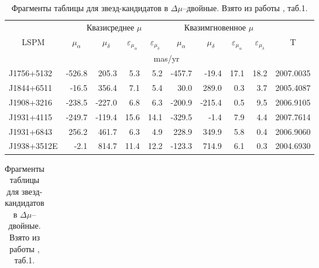 \begin{table}[htbp]
\centering
\caption{Фрагменты таблицы для звезд-кандидатов в $\Delta\mu$--двойные.  Взято из работы \cite{2015AstL...41..833K}, таб.1.}
\label{tab:candidates}
\vspace{5mm}
\begin{tabularx}{\textwidth}{l|r|r|r|r|r|r|r|r|l} \hline
           & \multicolumn{4}{c|}{Квазисреднее $\mu$ } & \multicolumn{4}{c|}{Квазимгновенное $\mu$}& \\ \cline{2-9}
\multicolumn{1}{c|}{LSPM}&\multicolumn{1}{c|}{$\mu_\alpha$}&\multicolumn{1}{c|}{$\mu_\delta$}&\multicolumn{1}{c|}{$\varepsilon_{\mu_\alpha}$}&\multicolumn{1}{c|}{$\varepsilon_{\mu_\delta}$}&\multicolumn{1}{c|}{$\mu_\alpha$}&\multicolumn{1}{c|}{$\mu_\delta$}&\multicolumn{1}{c|}{$\varepsilon_{\mu_\alpha}$}&\multicolumn{1}{c|}{$\varepsilon_{\mu_\delta}$}&\multicolumn{1}{c}{T}\\ \cline{2-9}	   
	       &\multicolumn{8}{c|}{mas/yr}&\\ \hline  
J1756+5132 & -526.8&  205.3&  5.3&  5.2& -457.7&  -19.4& 17.1& 18.2& 2007.0035\\
J1844+6511 &  -16.5&  356.4&  7.1&  5.4&   30.0&  289.0&  0.3&  3.7& 2005.4087\\
J1908+3216 & -238.5& -227.0&  6.8&  6.3& -200.9& -215.4&  0.5&  9.5& 2006.9105\\
J1931+4115 & -249.7& -119.4& 15.6& 14.1& -329.5&   -1.4&  7.9&  4.4& 2007.7614\\
J1931+6843 &  256.2&  461.7&  6.3&  4.9&  228.9&  349.9&  5.8&  0.4& 2006.9060\\
J1938+3512E&   -2.1&  814.7& 11.4& 12.2& -123.3&  714.9&  6.1&  0.3& 2004.6930\\ \hline
\end{tabularx}
\begin{tabularx}{\textwidth}{l|r|c|r|r|r|r|r|r|l}


\end{tabularx}
\end{table}
